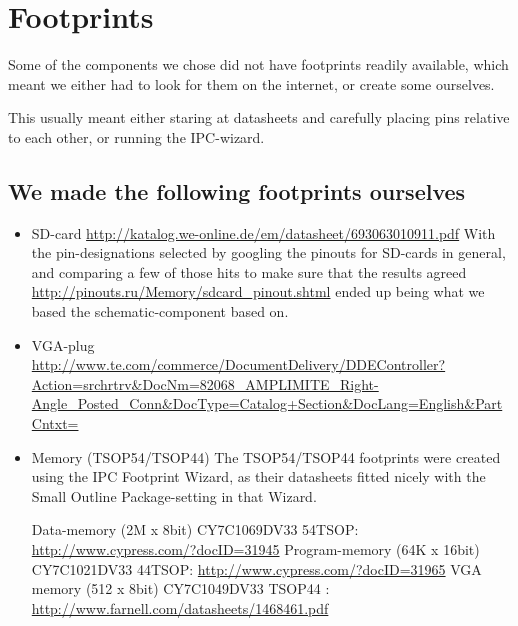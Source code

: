 \section {Footprints}
Some of the components we chose did not have footprints readily available, which
meant we either had to look for them on the internet, or create some ourselves.

This usually meant either staring at datasheets and carefully placing pins
relative to each other, or running the IPC-wizard.

\subsection {We made the following footprints ourselves}
\begin {itemize}
\item SD-card \url{http://katalog.we-online.de/em/datasheet/693063010911.pdf}
  With the pin-designations selected by googling the pinouts for SD-cards in
  general, and comparing a few of those hits to make sure that the results
  agreed \url{http://pinouts.ru/Memory/sdcard_pinout.shtml} ended up being what
  we based the schematic-component based on. 
\item VGA-plug \url{http://www.te.com/commerce/DocumentDelivery/DDEController?Action=srchrtrv&DocNm=82068_AMPLIMITE_Right-Angle_Posted_Conn&DocType=Catalog+Section&DocLang=English&PartCntxt=}
\item Memory (TSOP54/TSOP44)
The TSOP54/TSOP44 footprints were created using the IPC Footprint Wizard, as
their datasheets fitted nicely with the Small Outline Package-setting in that
Wizard.

Data-memory (2M x 8bit) CY7C1069DV33 54TSOP:
\url{http://www.cypress.com/?docID=31945} Program-memory (64K x 16bit)
CY7C1021DV33 44TSOP: \url{http://www.cypress.com/?docID=31965} VGA memory (512 x
8bit) CY7C1049DV33 TSOP44 : \url{http://www.farnell.com/datasheets/1468461.pdf}
\end {itemize}

